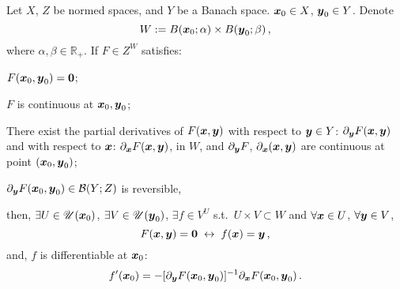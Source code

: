 \documentclass[openany]{book}
\begin{document}
\begin{theorem}
	\label{theorem: differentiability of implicit function}
	Let $X$, $Z$ be normed spaces, and $Y$ be a Banach space.
	$\boldsymbol{x}_0 \in X$, $\boldsymbol{y}_0 \in Y$. Denote
	\begin{equation*}
		W := B(\boldsymbol{x}_0; \alpha) \times B(\boldsymbol{y}_0; \beta)\,,
	\end{equation*}
	where $\alpha, \beta \in \mathbb R_+$.
	If $F \in Z^W$ satisfies:
	\begin{conditionlist}[label=\alph*)]
		\item $F(\boldsymbol{x}_0, \boldsymbol{y}_0) = \boldsymbol{0}$;
		\item $F$ is continuous at $\boldsymbol{x}_0, \boldsymbol{y}_0$; 
		\item There exist the partial derivatives of $F(\boldsymbol{x}, \boldsymbol{y})$ with respect to $\boldsymbol{y} \in Y$: $\partial_{\boldsymbol{y}} F(\boldsymbol{x}, \boldsymbol{y})$ and with respect to $\boldsymbol{x}$: $\partial_{\boldsymbol{x}} F(\boldsymbol{x}, \boldsymbol{y})$, in $W$, and $\partial_{\boldsymbol{y}} F$, $\partial_{\boldsymbol{x}}(\boldsymbol{x}, \boldsymbol{y})$ are continuous at point $(\boldsymbol{x}_0, \boldsymbol{y}_0)$;
		\item $\partial_{\boldsymbol{y}} F(\boldsymbol{x}_0, \boldsymbol{y}_0) \in \mathcal B(Y; Z)$ is reversible,
	\end{conditionlist}
	then, $\exists U \in \mathscr U(\boldsymbol{x}_0)$, $\exists V \in \mathscr U(\boldsymbol{y}_0)$, $\exists f \in V^U$ s.t.\ $U \times V \subset W$ and $\forall \boldsymbol{x} \in U$, $\forall \boldsymbol{y} \in V$, 
	\begin{equation*}
		F(\boldsymbol{x}, \boldsymbol{y}) = \boldsymbol{0}
		\;\leftrightarrow\;
		f(\boldsymbol{x}) = \boldsymbol{y}\,,
	\end{equation*}
	and, $f$ is differentiable at $\boldsymbol{x}_0$:
	\begin{equation}
		\label{equation: differential of implicit function}
		f'(\boldsymbol{x}_0) = - [\partial_{\boldsymbol{y}} F(\boldsymbol{x}_0, \boldsymbol{y}_0)]^{-1} \partial_{\boldsymbol{x}} F(\boldsymbol{x}_0, \boldsymbol{y}_0)\,.
	\end{equation}
\end{theorem}
\end{document}
